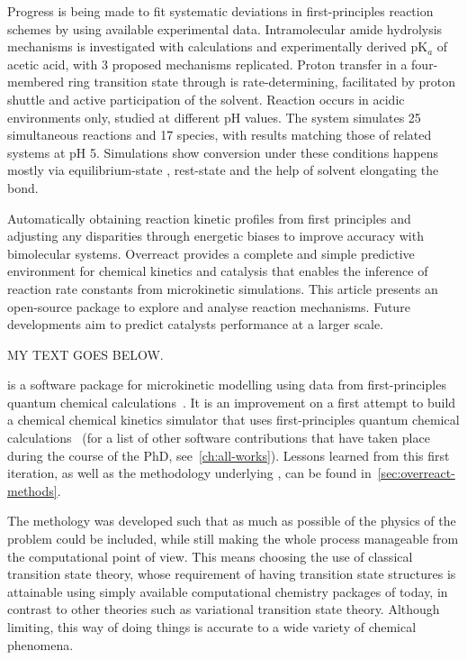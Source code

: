 Progress is being made to fit systematic deviations in first-principles reaction schemes by using available experimental data.
Intramolecular amide hydrolysis mechanisms is investigated with calculations and experimentally derived pK$_a$ of acetic acid, with 3 proposed mechanisms replicated.
Proton transfer in a four-membered ring transition state through  is rate-determining, facilitated by proton shuttle and active participation of the solvent.
Reaction occurs in acidic environments only, studied at different pH values.
The system simulates 25 simultaneous reactions and 17 species, with results matching those of related systems at pH 5.
Simulations show conversion under these conditions happens mostly via equilibrium-state , rest-state  and the help of solvent elongating the  bond.

Automatically obtaining reaction kinetic profiles from first principles and adjusting any disparities through energetic biases to improve accuracy with bimolecular systems.
Overreact provides a complete and simple predictive environment for chemical kinetics and catalysis that enables the inference of reaction rate constants from microkinetic simulations.
This article presents an open-source package to explore and analyse reaction mechanisms. Future developments aim to predict catalysts performance at a larger scale.

MY TEXT GOES BELOW.

\overreact is a software package for microkinetic modelling using data from
first-principles quantum chemical
calculations~\cite{Schneider2022,overreact2021zenodo}.
It is an improvement on a first attempt to build a
chemical chemical kinetics simulator that uses first-principles quantum
chemical calculations~\cite{pyrrole2019zenodo} (for a list of other software
contributions that have taken place during the course of the PhD, see~\cref{ch:all-works}).
Lessons learned from this first iteration, as well as the methodology
underlying \overreact, can be found in~\cref{sec:overreact-methods}.

The methology was developed such that as much as possible of the physics of the problem could be included,
while still making the whole process manageable from the computational point of view.
This means choosing the use of classical transition state theory,
whose requirement of having transition state structures is attainable
using simply available computational chemistry packages of today, in contrast to other theories
such as variational transition state theory.
Although limiting, this way of doing things is accurate to a wide variety of chemical phenomena.

